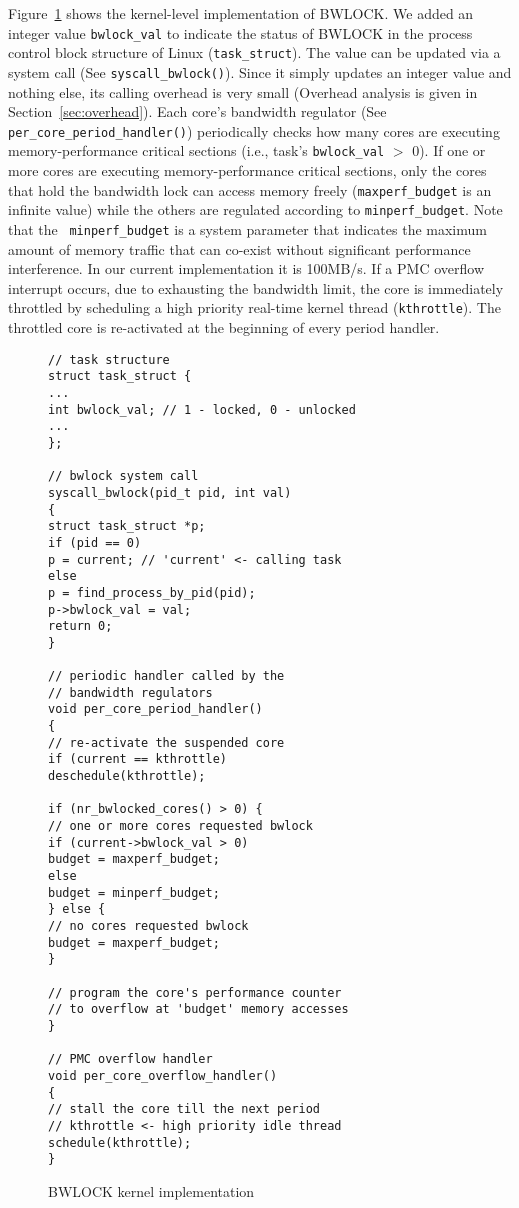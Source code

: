 \documentclass[times, 10pt,onecolumn]{article}
\begin{document}
Figure~\ref{fig:bwlock-kernel} shows the kernel-level implementation
of BWLOCK. We added an integer value \texttt{bwlock\_val} to indicate
the status of BWLOCK in the process control block structure of Linux
(\texttt{task\_struct}).
The value can be updated via a system
call (See \texttt{syscall\_bwlock()}). Since it simply updates an
integer value and nothing else, its calling overhead is very small
(Overhead analysis is given in Section~\ref{sec:overhead}).
Each core's bandwidth regulator (See \texttt{per\_core\_period\_handler()})
periodically checks how many cores are executing memory-performance
critical sections (i.e., task's \texttt{bwlock\_val} $>$ 0). If one or
more cores are executing memory-performance critical sections,
only the cores that hold the bandwidth lock can access memory freely
(\texttt{maxperf\_budget} is an infinite value) while the others are
regulated according to \texttt{minperf\_budget}. Note that the
~\texttt{minperf\_budget} is a system parameter that indicates the
maximum amount of memory traffic that can co-exist without significant
performance interference. In our current implementation it is 100MB/s.
If a PMC overflow interrupt occurs, due to exhausting the bandwidth
limit, the core is immediately throttled
by scheduling a high priority real-time kernel thread
(\texttt{kthrottle}). The throttled core is re-activated at the
beginning of every period handler.

\begin{figure}
\begin{lstlisting}
// task structure
struct task_struct {
...
int bwlock_val; // 1 - locked, 0 - unlocked
...
};

// bwlock system call
syscall_bwlock(pid_t pid, int val)
{
struct task_struct *p;
if (pid == 0)
p = current; // 'current' <- calling task
else
p = find_process_by_pid(pid);
p->bwlock_val = val;
return 0;
}

// periodic handler called by the
// bandwidth regulators
void per_core_period_handler()
{
// re-activate the suspended core
if (current == kthrottle)
deschedule(kthrottle);

if (nr_bwlocked_cores() > 0) {
// one or more cores requested bwlock
if (current->bwlock_val > 0)
budget = maxperf_budget;
else
budget = minperf_budget;
} else {
// no cores requested bwlock
budget = maxperf_budget;
}

// program the core's performance counter
// to overflow at 'budget' memory accesses
}

// PMC overflow handler
void per_core_overflow_handler()
{
// stall the core till the next period
// kthrottle <- high priority idle thread
schedule(kthrottle);
}

\end{lstlisting}
\caption{BWLOCK kernel implementation}
\label{fig:bwlock-kernel}
\end{figure}
\end{document}
